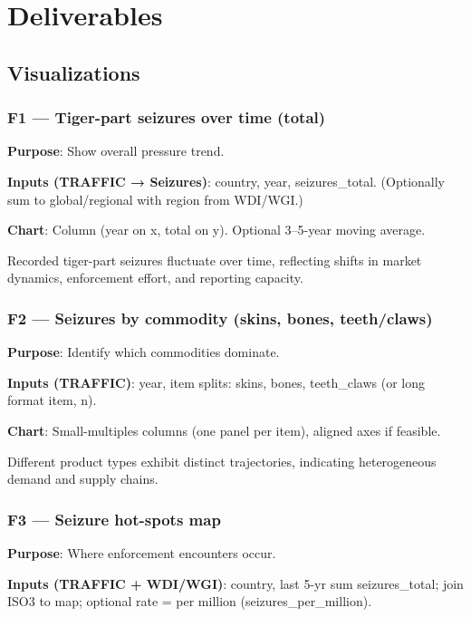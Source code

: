 \documentclass[
]{article}
\begin{document}
\section{Deliverables}\label{deliverables}

\subsection{Visualizations}\label{visualizations}

\subsubsection{F1 --- Tiger-part seizures over time
(total)}\label{f1-tiger-part-seizures-over-time-total}

\textbf{Purpose}: Show overall pressure trend.

\textbf{Inputs (TRAFFIC → Seizures)}: country, year, seizures\_total.
(Optionally sum to global/regional with region from WDI/WGI.)

\textbf{Chart}: Column (year on x, total on y). Optional 3--5-year
moving average.

Recorded tiger-part seizures fluctuate over time, reflecting shifts in
market dynamics, enforcement effort, and reporting capacity.

\subsubsection{F2 --- Seizures by commodity (skins, bones,
teeth/claws)}\label{f2-seizures-by-commodity-skins-bones-teethclaws}

\textbf{Purpose}: Identify which commodities dominate.

\textbf{Inputs (TRAFFIC)}: year, item splits: skins, bones, teeth\_claws
(or long format item, n).

\textbf{Chart}: Small-multiples columns (one panel per item), aligned
axes if feasible.

Different product types exhibit distinct trajectories, indicating
heterogeneous demand and supply chains.

\subsubsection{F3 --- Seizure hot-spots
map}\label{f3-seizure-hot-spots-map}

\textbf{Purpose}: Where enforcement encounters occur.

\textbf{Inputs (TRAFFIC + WDI/WGI)}: country, last 5-yr sum
seizures\_total; join ISO3 to map; optional rate = per million
(seizures\_per\_million).
\end{document}
